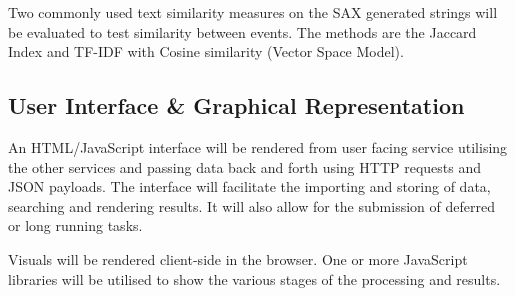 \documentclass[../report.tex]{subfiles}
\begin{document}
	Two commonly used text similarity measures on the SAX generated strings will be evaluated to test similarity between events.  The methods are the Jaccard Index and TF-IDF with Cosine similarity (Vector Space Model).

\subsection{User Interface \& Graphical Representation}

	An HTML/JavaScript interface will be rendered from user facing service utilising the other services and passing data back and forth using HTTP requests and JSON payloads.  The interface will facilitate the importing and storing of data, searching and rendering results.  It will also allow for the submission of deferred or long running tasks.
	
	Visuals will be rendered client-side in the browser.  One or more JavaScript libraries will be utilised to show the various stages of the processing and results.
\end{document}
